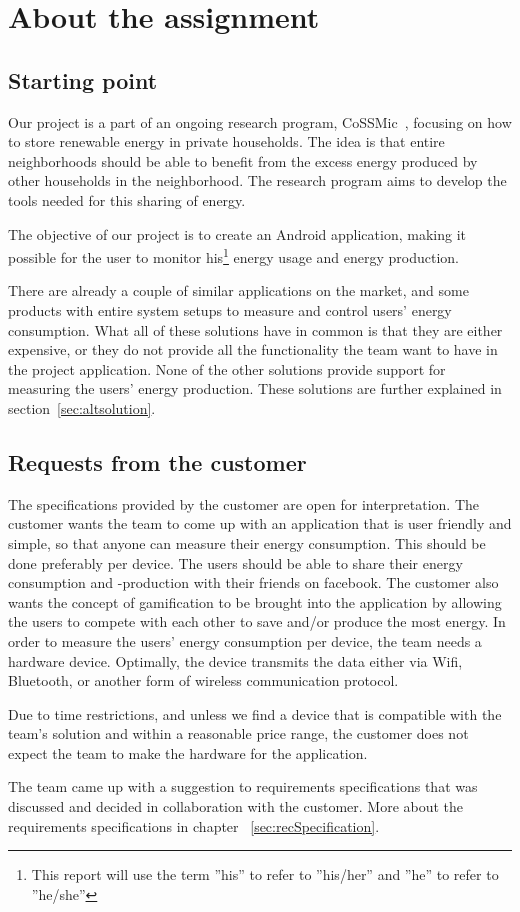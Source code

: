 \section{About the assignment}
\subsection{Starting point}
Our project is a part of an ongoing research program, CoSSMic~\cite{cossmic}, focusing on how to store renewable energy in private households. 
The idea is that entire neighborhoods should be able to benefit from the excess energy produced by other households in the neighborhood. 
The research program aims to develop the tools needed for this sharing of energy. 

The objective of our project is to create an Android application, making it possible for the user to monitor his\footnote{This report will use the term ''his'' to refer to ''his/her'' and ''he'' to refer to ''he/she''} 
energy usage and energy production. 

There are already a couple of similar applications on the market, and some products with entire system setups to measure and control users' energy consumption. 
What all of these solutions have in common is that they are either expensive, or they do not provide all the functionality the team want to have in the project application. 
None of the other solutions provide support for measuring the users' energy production. These solutions are further explained in section~\ref{sec:altsolution}.

\subsection{Requests from the customer}
The specifications provided by the customer are open for interpretation. The customer wants the team to come up with an application that is user friendly and simple, 
so that anyone can measure their energy consumption. This should be done preferably per device. The users should be able to share their energy consumption and -production with their friends on \gls{facebook}. 
The customer also wants the concept of \gls{gamification} to be brought into the application by allowing the users to compete with each other to save and/or produce the most energy. 
In order to measure the users' energy consumption per device, the team needs a hardware device. Optimally, the device transmits the data either via Wifi, Bluetooth, or another form of wireless communication protocol. 

Due to time restrictions, and unless we find a device that is compatible with the team's solution and within a reasonable price range, the customer does not expect the team to make the hardware for the application.

The team came up with a suggestion to requirements specifications that was discussed and decided in collaboration with the customer. More about the requirements specifications in chapter ~\ref{sec:recSpecification}.
